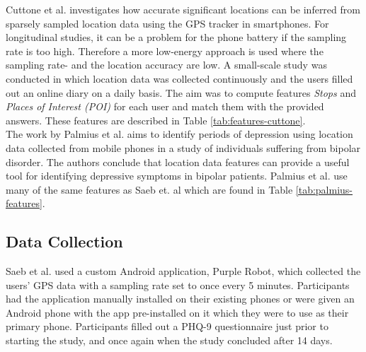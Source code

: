 


Cuttone et al. \cite{sparse-location-2014} investigates how accurate significant locations can be inferred from sparsely sampled location data using the GPS tracker in smartphones. For longitudinal studies, it can be a problem for the phone battery if the sampling rate is too high. Therefore a more low-energy approach is used where the sampling rate- and the location accuracy are low. A small-scale study was conducted in which location data was collected continuously and the users filled out an online diary on a daily basis. The aim was to compute features \textit{Stops} and \textit{Places of Interest (POI)} for each user and match them with the provided answers. These features are described in Table \ref{tab:features-cuttone}. \\



The work by Palmius et al. \cite{palmius2017} aims to identify periods of depression using location data collected from mobile phones in a study of individuals suffering from bipolar disorder. The authors conclude that location data features can provide a useful tool for identifying depressive symptoms in bipolar patients. Palmius et al. use many of the same features as Saeb et. al \cite{Saeb2015, saeb2016} which are found in Table \ref{tab:palmius-features}.



\subsection{Data Collection}
Saeb et al. used a custom Android application, Purple Robot, which collected the users' GPS data with a sampling rate set to once every 5 minutes. Participants had the application manually installed on their existing phones or were given an Android phone with the app pre-installed on it which they were to use as their primary phone. Participants filled out a PHQ-9 questionnaire just prior to starting the study, and once again when the study concluded after 14 days.\\


